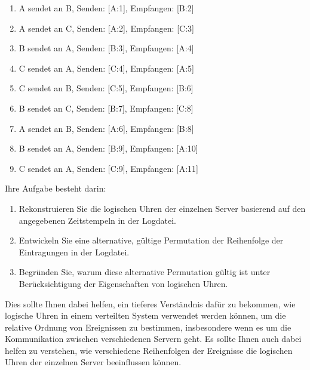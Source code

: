 \documentclass{article}
\begin{document}
\begin{enumerate}
  \item A sendet an B, Senden: [A:1], Empfangen: [B:2]
  \item A sendet an C, Senden: [A:2], Empfangen: [C:3]
  \item B sendet an A, Senden: [B:3], Empfangen: [A:4]
  \item C sendet an A, Senden: [C:4], Empfangen: [A:5]
  \item C sendet an B, Senden: [C:5], Empfangen: [B:6]
  \item B sendet an C, Senden: [B:7], Empfangen: [C:8]
  \item A sendet an B, Senden: [A:6], Empfangen: [B:8]
  \item B sendet an A, Senden: [B:9], Empfangen: [A:10]
  \item C sendet an A, Senden: [C:9], Empfangen: [A:11]
\end{enumerate}
Ihre Aufgabe besteht darin:
\begin{enumerate}
  \item Rekonstruieren Sie die logischen Uhren der einzelnen Server basierend auf den angegebenen Zeitstempeln in der Logdatei.
  \item Entwickeln Sie eine alternative, gültige Permutation der Reihenfolge der Eintragungen in der Logdatei.
  \item Begründen Sie, warum diese alternative Permutation gültig ist unter Berücksichtigung der Eigenschaften von logischen Uhren.
\end{enumerate}
Dies sollte Ihnen dabei helfen, ein tieferes Verständnis dafür zu bekommen, wie logische Uhren in einem verteilten System verwendet werden können, um die relative Ordnung von Ereignissen zu bestimmen, insbesondere wenn es um die Kommunikation zwischen verschiedenen Servern geht. Es sollte Ihnen auch dabei helfen zu verstehen, wie verschiedene Reihenfolgen der Ereignisse die logischen Uhren der einzelnen Server beeinflussen können.
\end{document}
